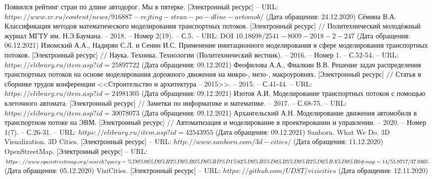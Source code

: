 \makeatletter \renewcommand{} \makeatother
\renewcommand\refname{Список использованных источников}
\begin{thebibliography}{00}
	
	Появился рейтинг стран по длине автодорог. Мы в пятерке. [Электронный ресурс] -- URL: $https://www.zr.ru/content/news/916887-rejting-stran-po-dline-avtomob/$ (Дата обращения: 24.12.2020)
	Сёмина В.А. Классификация методов математического моделирования транспортных потоков. [Электронный ресурс] $//$ Политехнический молодёжный журнал МГТУ им. Н.Э.Баумана. -- 2018. -- Номер 2(19). -- С.5. -- URL: DOI $10.18698/2541-8009-2018-2-247$ (Дата обращения: 06.12.2021)
	Изюмский А.А., Надирян С.Л. и Сенин И.С. Применение имитационного моделирования в сфере моделирования транспортных потоков. [Электронный ресурс] $//$ Наука. Техника. Технологии (Политехнический вестник). -- 2016. -- Номер 1. -- С.52-54. -- URL: $https://elibrary.ru/item.asp?id=25897722$ (Дата обращения: 09.12.2021)
	Феофилова А.А., Фиалкин В.В. Решение задач распределения транспортных потоков на основе моделирования дорожного движения на микро-, мезо-, макроуровнях. [Электронный ресурс] $//$ Статья в сборнике трудов конференции <<Строительство и архитектура -- 2015>>. -- 2015. -- С.41-44. -- URL: $https://elibrary.ru/item.asp?id=24981305$ (Дата обращения: 09.12.2021)
	Изотов А.И. Моделирование транспортных потоков с помощью клеточного автомата. [Электронный ресурс] $//$ Заметки по информатике и математике. -- 2017. -- С.68-75. -- URL: $https://elibrary.ru/item.asp?id=30078073$ (Дата обращения: 09.12.2021)
	Архангельский А.Н. Моделирование движения автомобиля в транспортном потоке на ЭВМ. [Электронный ресурс] $//$ Автоматизация и моделирование в проектировании и управлении. -- 2020. -- Номер 1(7). -- С.26-31. -- URL: $https://elibrary.ru/item.asp?id=42543955$ (Дата обращения: 09.12.2021)
	Sanborn. What We Do. 3D Visualization. 3D Cities. [Электронный ресурс] -- URL: $http://www.sanborn.com/3d-cities/$ (Дата обращения: 11.12.2020)
	OpenStreetMap. [Электронный ресурс] -- URL: $https://www.openstreetmap.org/search?\\query=\%D0\%98\%D0\%B2\%D0\%B0\%D0\%BD\%D1\%82\%D0\\\%B5\%D0\%B5\%D0\%B2\%D0\%BA\%D0\%B0\#map=14/55.9717/37.9305$ (Дата обращения: 05.12.2020)
	ViziCities. [Электронный ресурс] -- URL: $https://github.com/UDST/vizicities$ (Дата обращения: 12.11.2020)

\end{thebibliography}
